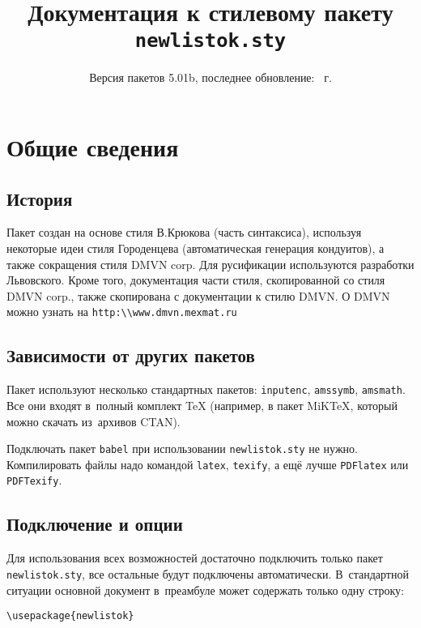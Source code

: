 \documentclass[10pt]{article}
\title{Документация к стилевому пакету \texttt{newlistok.sty}}
\date{Версия пакетов 5.01b, последнее обновление: \сегодня~г.}
\newcommand{\tw}[1]{\texttt{#1}} %
\begin{document}
\maketitle


\tableofcontents
\pagebreak





\section{Общие сведения}

\subsection{История}
Пакет создан на основе стиля В.Крюкова (часть синтаксиса), используя некоторые идеи стиля Городенцева
(автоматическая генерация кондуитов), а также сокращения стиля DMVN corp. Для русификации используются разработки Львовского. Кроме того, документация части стиля, скопированной со стиля DMVN corp., также скопирована с документации к стилю DMVN. О DMVN можно узнать на \verb'http:\\www.dmvn.mexmat.ru'

\subsection{Зависимости от других пакетов}

Пакет используют несколько стандартных пакетов: \texttt{inputenc}, \texttt{amssymb},
\texttt{amsmath}. Все они входят в~полный комплект \TeX{} (например, в пакет
MiK\TeX, который можно скачать из~архивов CTAN).

Подключать пакет \tw{babel} при использовании \tw{newlistok.sty} не нужно.
Компилировать файлы надо командой \tw{latex}, \tw{texify}, а ещё лучше \tw{PDFlatex} или \tw{PDFTexify}.



\subsection{Подключение и опции}
Для использования всех возможностей достаточно подключить только пакет \texttt{newlistok.sty},
все остальные будут подключены автоматически. В~стандартной ситуации основной документ
в~преамбуле может содержать только одну строку:
\begin{verbatim}
\usepackage{newlistok}
\end{verbatim}
\end{document}

